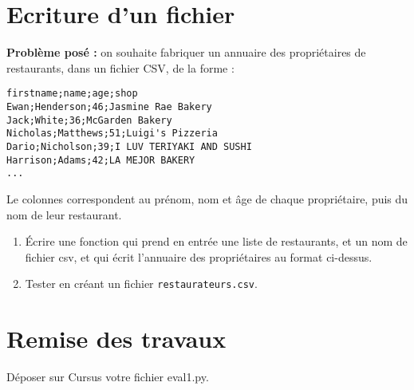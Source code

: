 \documentclass[11pt,a4paper]{article}
\begin{document}
\section{Ecriture d'un fichier}
\textbf{Problème posé :} on souhaite fabriquer un annuaire des propriétaires de restaurants, dans un fichier CSV, de la forme : 
\begin{verbatim}
firstname;name;age;shop
Ewan;Henderson;46;Jasmine Rae Bakery
Jack;White;36;McGarden Bakery
Nicholas;Matthews;51;Luigi's Pizzeria
Dario;Nicholson;39;I LUV TERIYAKI AND SUSHI
Harrison;Adams;42;LA MEJOR BAKERY
...
\end{verbatim}
Le colonnes correspondent au prénom, nom et âge de chaque propriétaire, puis du nom de leur restaurant. 

\begin{enumerate}
\item Écrire une fonction qui prend en entrée une liste de restaurants, et un nom de fichier csv, et qui écrit l'annuaire des propriétaires au format ci-dessus. 
\item Tester en créant un fichier \verb+restaurateurs.csv+.

\end{enumerate}

\section*{Remise des travaux}
Déposer sur Cursus votre fichier eval1.py.
\end{document}
